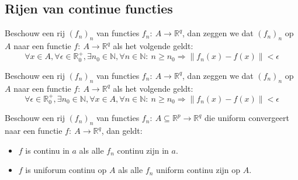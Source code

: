 \documentclass[main.tex]{subfiles}
\begin{document}
\subsection{Rijen van continue functies}
\label{sec:rijen-van-continue}

\begin{de}
  Beschouw een rij $(f_{n})_{n}$ van functies $f_{n}:\ A \rightarrow \mathbb{R}^{q}$, dan zeggen we dat $(f_{n})_{n}$  op $A$ naar een functie $f:\ A \rightarrow \mathbb{R}^{q}$ als het volgende geldt:
  \[ \forall x\in A, \forall \epsilon \in \mathbb{R}_{0}^{+}, \exists n_{0} \in \mathbb{N}, \forall n \in \mathbb{N}:\ n \ge n_{0} \Rightarrow \|f_{n}(x) -f(x)\| < \epsilon \]
\end{de}

\begin{de}
  Beschouw een rij $(f_{n})_{n}$ van functies $f_{n}:\ A \rightarrow \mathbb{R}^{q}$, dan zeggen we dat $(f_{n})_{n}$  op $A$ naar een functie $f:\ A \rightarrow \mathbb{R}^{q}$ als het volgende geldt:
  \[ \forall \epsilon \in \mathbb{R}_{0}^{+}, \exists n_{0} \in \mathbb{N}, \forall x\in A, \forall n \in \mathbb{N}:\ n \ge n_{0} \Rightarrow \|f_{n}(x) -f(x)\| < \epsilon \]
\end{de}

\begin{st}
  Beschouw een rij $(f_{n})_{n}$ van functies $f_{n}:\ A \subseteq \mathbb{R}^{p} \rightarrow \mathbb{R}^{q}$ die uniform convergeert naar een functie $f:\ A \rightarrow \mathbb{R}^{q}$, dan geldt:
  \begin{itemize}
  \item $f$ is continu in $a$ als alle $f_n$ continu zijn in $a$.
  \item $f$ is uniforum continu op $A$ als alle $f_n$ uniform continu zijn op $A$.
  \end{itemize}
\end{st}
\end{document}
